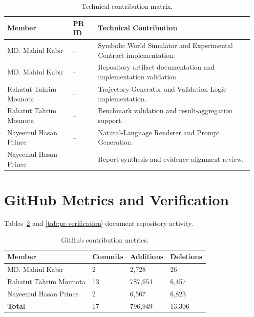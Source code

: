 \documentclass{iutbscthesis}
\begin{document}
\begin{appendices}
\begin{table}[H]
\centering
\small
\renewcommand{\arraystretch}{1.4}
\begin{tabular}{|p{}|p{}|p{}|}
\hline
\textbf{Member} & \textbf{PR ID} & \textbf{Technical Contribution} \\
\hline
MD. Mahiul Kabir & -- & Symbolic World Simulator and Experimental Contract implementation. \\
\hline
MD. Mahiul Kabir & -- & Repository artifact documentation and implementation validation. \\
\hline
Rahatut Tahrim Mounota & -- & Trajectory Generator and Validation Logic implementation. \\
\hline
Rahatut Tahrim Mounota & -- & Benchmark validation and result-aggregation support. \\
\hline
Nayeemul Hasan Prince & -- & Natural-Language Renderer and Prompt Generation. \\
\hline
Nayeemul Hasan Prince & -- & Report synthesis and evidence-alignment review. \\
\hline
\end{tabular}
\caption{Technical contribution matrix.}
\label{tab:technical-contributions}
\end{table}

\section{GitHub Metrics and Verification}
Tables~\ref{tab:github-metrics} and \ref{tab:pr-verification} document repository activity.

\begin{table}[H]
\centering
\small
\begin{tabular}{p{}p{}p{}p{}}
\toprule
\textbf{Member} & \textbf{Commits} & \textbf{Additions} & \textbf{Deletions} \\
\midrule
MD. Mahiul Kabir & 2 & 2,728 & 26 \\
Rahatut Tahrim Mounota & 13 & 787,654 & 6,457 \\
Nayeemul Hasan Prince & 2 & 6,567 & 6,823 \\
\midrule
\textbf{Total} & 17 & 796,949 & 13,306 \\
\bottomrule
\end{tabular}
\caption{GitHub contribution metrics.}
\label{tab:github-metrics}
\end{table}


\end{appendices}
\end{document}
